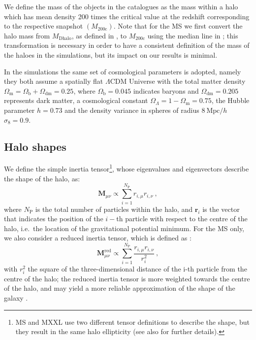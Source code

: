 \documentclass[a4paper,11pt]{article}
\begin{document}
We define the mass of the objects in the catalogues as the mass within a halo which has mean density 200 times the critical value at the redshift corresponding to the respective snapshot $(M_{200\mathrm{c}})$. Note that for the MS we first convert the halo mass from $M_{\mathrm{Dhalo}}$, as defined in \cite{Jiangetal2014}, to $M_{200\mathrm{c}}$ using the median line in \cite[figure 2]{Jiangetal2014}; this transformation is necessary in order to have a consistent definition of the mass of the haloes in the simulations, but its impact on our results is minimal.

In the simulations the same set of cosmological parameters is adopted, namely they both assume a spatially flat $\Lambda$CDM Universe with the total matter density $\Omega_{\mathrm{m}} = \Omega_{\mathrm{b}} + \Omega_{\mathrm{dm}} = 0.25$, where $\Omega _{\mathrm{b}} = 0.045$ indicates baryons and $\Omega_{\mathrm{dm}} = 0.205$ represents dark matter, a cosmological constant $\Omega_{\Lambda} = 1 - \Omega_{\mathrm{m}} = 0.75$, the Hubble parameter $h = 0.73$ and the density variance in spheres of radius $8 \ \mbox{Mpc}/h$ $\sigma_8 = 0.9$. 

\subsection{Halo shapes}
\label{subsec:haloshapes}
We define the simple inertia tensor\footnote{MS and MXXL use two different tensor definitions to describe the shape, but they result in the same halo ellipticity (see also \cite{Bettetal2007} for further details).}, whose eigenvalues and eigenvectors describe the shape of the halo, as:
\begin{equation}
    \mathbf{M}_{\mu \nu} \propto \sum_{i=1}^{N_{\mathrm{P}}} r_{i, \mu} r_{i, \nu} \ ,
	\label{eq:sit}
\end{equation}
where $N_{\mathrm{P}}$ is the total number of particles within the halo, and $\mathbf{r}_{i}$ is the vector that indicates the position of the $i-$th particle with respect to the centre of the halo, i.e.\ the location of the gravitational potential minimum. For the MS only, we also consider a reduced inertia tensor, which is defined as \cite{Pereiraetal2008}:
\begin{equation}
    \mathbf{M}_{\mu \nu}^{\mathrm{red}} \propto \sum _{i=1}^{N_{\mathrm{P}}} \frac{r_{i, \mu} r_{i, \nu}}{r_i^2} \ ,
	\label{eq:rit}
\end{equation}
with $r_i^2$ the square of the three-dimensional distance of the i-th particle from the centre of the halo; the reduced inertia tensor is more weighted towards the centre of the halo, and may yield a more reliable approximation of the shape of the galaxy \cite{Joachimietal2013b, Chisarietal2015}. 
\end{document}
